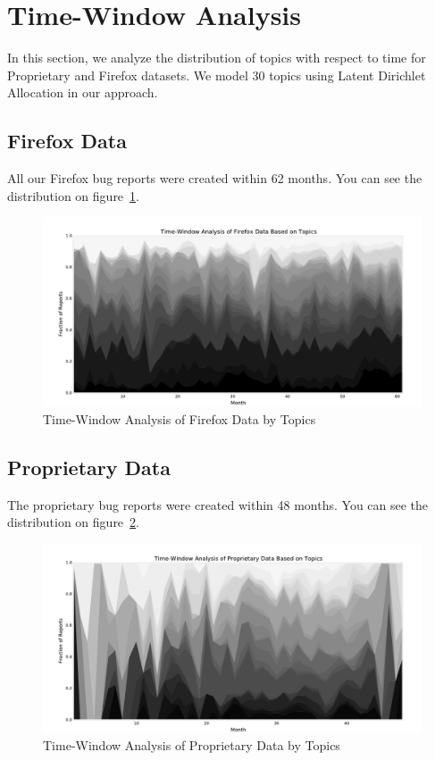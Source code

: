 \section{Time-Window Analysis}

In this section, we analyze the distribution of topics with respect to time for Proprietary and Firefox datasets. We model 30 topics using Latent Dirichlet Allocation in our approach.

\subsection{Firefox Data}

All our Firefox bug reports were created within 62 months. You can see the distribution on figure~\ref{fig:distribution.firefox.topic}.

\begin{figure}[htbp]
    \centering
        \includegraphics[width=\textwidth]{./images/topic_component_distribution/firefox_topic.pdf}
    \caption{Time-Window Analysis of Firefox Data by Topics}
    \label{fig:distribution.firefox.topic}
\end{figure}

\subsection{Proprietary Data}

The proprietary bug reports were created within 48 months. You can see the distribution on figure~\ref{fig:distribution.prop.topic}.

\begin{figure}[htbp]
    \centering
        \includegraphics[width=\textwidth]{./images/topic_component_distribution/proprietary_topic.pdf}
    \caption{Time-Window Analysis of Proprietary Data by Topics}
    \label{fig:distribution.prop.topic}
\end{figure}

